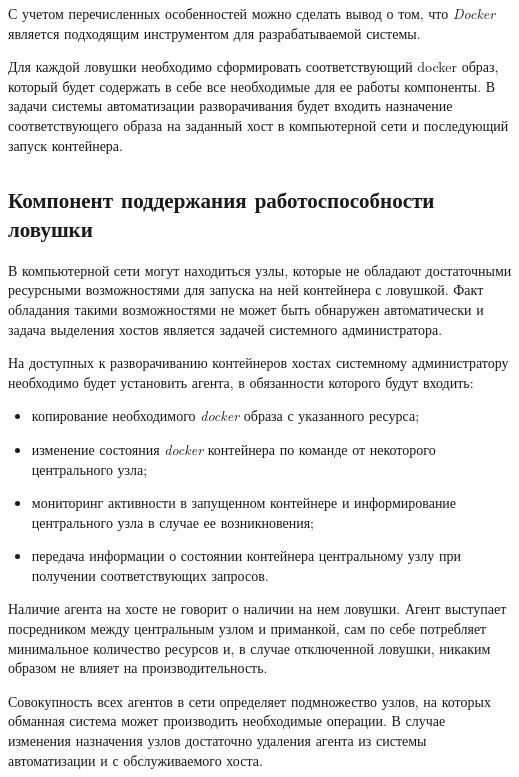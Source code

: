 С учетом перечисленных особенностей можно сделать вывод о том, что \textit{Docker} является подходящим инструментом для разрабатываемой системы.

Для каждой ловушки необходимо сформировать соответствующий docker образ, который будет содержать в себе все необходимые для ее работы компоненты. В задачи системы автоматизации разворачивания будет входить назначение соответствующего образа на заданный хост в компьютерной сети и последующий запуск контейнера.

\subsection{Компонент поддержания работоспособности ловушки}

В компьютерной сети могут находиться узлы, которые не обладают достаточными ресурсными возможностями для запуска на ней контейнера с ловушкой. Факт обладания такими возможностями не может быть обнаружен автоматически и задача выделения хостов является задачей системного администратора.

На доступных к разворачиванию контейнеров хостах системному администратору необходимо будет установить агента, в обязанности которого будут входить:

\begin{itemize}
\item копирование необходимого \textit{docker} образа с указанного ресурса;
\item изменение состояния \textit{docker} контейнера по команде от некоторого центрального узла;
\item мониторинг активности в запущенном контейнере и информирование центрального узла в случае ее возникновения;
\item передача информации о состоянии контейнера центральному узлу при получении соответствующих запросов.
\end{itemize}

Наличие агента на хосте не говорит о наличии на нем ловушки. Агент выступает посредником между центральным узлом и приманкой, сам по себе потребляет минимальное количество ресурсов и, в случае отключенной ловушки, никаким образом не влияет на производительность.

Совокупность всех агентов в сети определяет подмножество узлов, на которых обманная система может производить необходимые операции. В случае изменения назначения узлов достаточно удаления агента из системы автоматизации и с обслуживаемого хоста.

